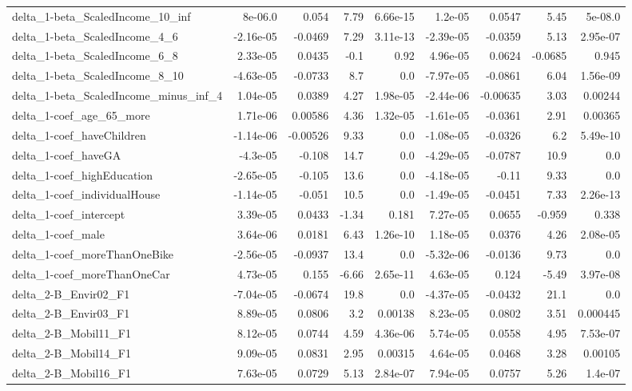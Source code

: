 \begin{tabular}{lrrrrrrrr}
delta_1-beta_ScaledIncome_10_inf & 8e-06.0 & 0.054 & 7.79 & 6.66e-15 & 1.2e-05 & 0.0547 & 5.45 & 5e-08.0 \\
delta_1-beta_ScaledIncome_4_6 & -2.16e-05 & -0.0469 & 7.29 & 3.11e-13 & -2.39e-05 & -0.0359 & 5.13 & 2.95e-07 \\
delta_1-beta_ScaledIncome_6_8 & 2.33e-05 & 0.0435 & -0.1 & 0.92 & 4.96e-05 & 0.0624 & -0.0685 & 0.945 \\
delta_1-beta_ScaledIncome_8_10 & -4.63e-05 & -0.0733 & 8.7 & 0.0 & -7.97e-05 & -0.0861 & 6.04 & 1.56e-09 \\
delta_1-beta_ScaledIncome_minus_inf_4 & 1.04e-05 & 0.0389 & 4.27 & 1.98e-05 & -2.44e-06 & -0.00635 & 3.03 & 0.00244 \\
delta_1-coef_age_65_more & 1.71e-06 & 0.00586 & 4.36 & 1.32e-05 & -1.61e-05 & -0.0361 & 2.91 & 0.00365 \\
delta_1-coef_haveChildren & -1.14e-06 & -0.00526 & 9.33 & 0.0 & -1.08e-05 & -0.0326 & 6.2 & 5.49e-10 \\
delta_1-coef_haveGA & -4.3e-05 & -0.108 & 14.7 & 0.0 & -4.29e-05 & -0.0787 & 10.9 & 0.0 \\
delta_1-coef_highEducation & -2.65e-05 & -0.105 & 13.6 & 0.0 & -4.18e-05 & -0.11 & 9.33 & 0.0 \\
delta_1-coef_individualHouse & -1.14e-05 & -0.051 & 10.5 & 0.0 & -1.49e-05 & -0.0451 & 7.33 & 2.26e-13 \\
delta_1-coef_intercept & 3.39e-05 & 0.0433 & -1.34 & 0.181 & 7.27e-05 & 0.0655 & -0.959 & 0.338 \\
delta_1-coef_male & 3.64e-06 & 0.0181 & 6.43 & 1.26e-10 & 1.18e-05 & 0.0376 & 4.26 & 2.08e-05 \\
delta_1-coef_moreThanOneBike & -2.56e-05 & -0.0937 & 13.4 & 0.0 & -5.32e-06 & -0.0136 & 9.73 & 0.0 \\
delta_1-coef_moreThanOneCar & 4.73e-05 & 0.155 & -6.66 & 2.65e-11 & 4.63e-05 & 0.124 & -5.49 & 3.97e-08 \\
delta_2-B_Envir02_F1 & -7.04e-05 & -0.0674 & 19.8 & 0.0 & -4.37e-05 & -0.0432 & 21.1 & 0.0 \\
delta_2-B_Envir03_F1 & 8.89e-05 & 0.0806 & 3.2 & 0.00138 & 8.23e-05 & 0.0802 & 3.51 & 0.000445 \\
delta_2-B_Mobil11_F1 & 8.12e-05 & 0.0744 & 4.59 & 4.36e-06 & 5.74e-05 & 0.0558 & 4.95 & 7.53e-07 \\
delta_2-B_Mobil14_F1 & 9.09e-05 & 0.0831 & 2.95 & 0.00315 & 4.64e-05 & 0.0468 & 3.28 & 0.00105 \\
delta_2-B_Mobil16_F1 & 7.63e-05 & 0.0729 & 5.13 & 2.84e-07 & 7.94e-05 & 0.0757 & 5.26 & 1.4e-07 \\

\end{tabular}
